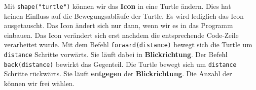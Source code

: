 Mit \lstinline{shape("turtle")} können wir das \textbf{Icon} in eine Turtle ändern. Dies hat keinen Einfluss auf die Bewegungsabläufe der Turtle. Es wird lediglich das Icon ausgetauscht. Das Icon ändert sich nur dann, wenn wir es in das Programm einbauen. Das Icon verändert sich erst nachdem die entsprechende Code-Zeile verarbeitet wurde. Mit dem Befehl \lstinline{forward(distance)} bewegt sich die Turtle um \lstinline{distance} Schritte vorwärts. Sie läuft dabei in \textbf{Blickrichtung}. Der Befehl \lstinline{back(distance)} bewirkt das Gegenteil. Die Turtle bewegt sich um \lstinline{distance} Schritte rückwärts. Sie läuft \textbf{entgegen} der \textbf{Blickrichtung}. Die Anzahl der  können wir frei wählen.

\begin{figure}[htb]
\centering
{}
\hfill
{}
\hfill
\fbox{
\begin{minipage}[c][4cm]{4cm}
\centering

\end{minipage}}
\end{figure}
